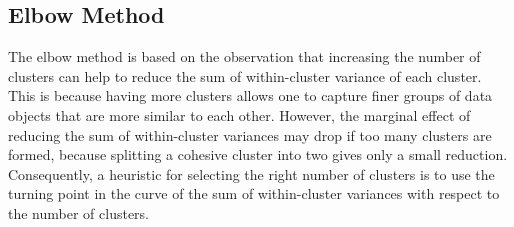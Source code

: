 \documentclass[12pt]{article}
\begin{document}
\subsection{Elbow Method}

The elbow method is based on the observation that increasing the number of clusters can help to reduce the sum of within-cluster variance of each cluster. This is because having more clusters allows one to capture finer groups of data objects that are more similar to each other. However, the marginal effect of reducing the sum of within-cluster variances may drop if too many clusters are formed, because splitting a cohesive cluster into two gives only a small reduction. Consequently, a heuristic for selecting the right number of clusters is to use the turning point in the curve of the sum of within-cluster variances with respect to the number of clusters.
\end{document}
